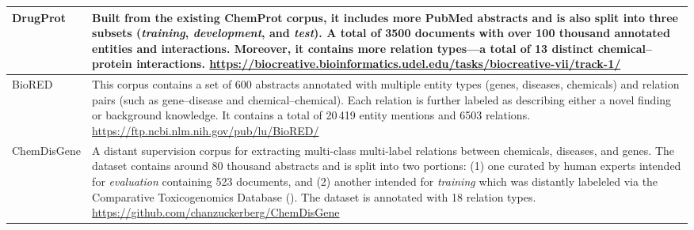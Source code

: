 \begin{longtable}[c]{E{0.30\textwidth}p{0.62\textwidth}}
\midrule

DrugProt\newline
{}
&
Built from the existing ChemProt corpus, it includes more PubMed abstracts and is also split into three subsets (\textit{training}, \textit{development}, and \textit{test}). A total of 3500 documents with over 100 thousand annotated entities and interactions. Moreover, it contains more relation types---a total of 13 distinct chemical--protein interactions.\newline
{\footnotesize\url{https://biocreative.bioinformatics.udel.edu/tasks/biocreative-vii/track-1/}}
\\

\midrule

BioRED\newline
{}
&
This corpus contains a set of 600  abstracts annotated with multiple entity types (genes, diseases, chemicals) and relation pairs (such as gene--disease and chemical--chemical). Each relation is further labeled as describing either a novel finding or background knowledge. It contains a total of 20\,419 entity mentions and 6503 relations.\newline
{\footnotesize\url{https://ftp.ncbi.nlm.nih.gov/pub/lu/BioRED/}}
\\

\midrule

ChemDisGene\newline
{}
&
A distant supervision corpus for extracting multi-class multi-label relations between chemicals, diseases, and genes. The dataset contains around 80 thousand  abstracts and is split into two portions: (1) one curated by human experts intended for \textit{evaluation} containing 523 documents, and (2) another intended for \textit{training} which was distantly labeleled via the Comparative Toxicogenomics Database (). The dataset is annotated with 18 relation types.\newline
{\footnotesize\url{https://github.com/chanzuckerberg/ChemDisGene}}
\\

\bottomrule

\end{longtable}
\endgroup
